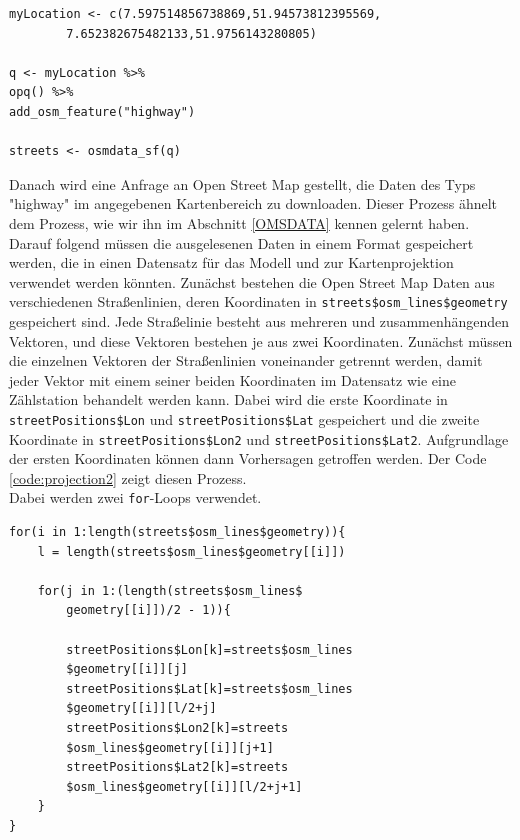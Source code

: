 \documentclass[a4paper,12pt]{thesis}
\begin{document}
\begin{lstlisting}[caption={Wahl des Kartenausschnitts},label=code:projection1]
myLocation <- c(7.597514856738869,51.94573812395569,   
		7.652382675482133,51.9756143280805)
		
q <- myLocation %>% 
opq() %>%
add_osm_feature("highway")

streets <- osmdata_sf(q)
\end{lstlisting}

Danach wird eine Anfrage an Open Street Map gestellt, die Daten des Typs "highway" im angegebenen Kartenbereich zu downloaden. Dieser Prozess ähnelt dem Prozess, wie wir ihn im Abschnitt \ref{OMSDATA} kennen gelernt haben.\\
Darauf folgend müssen die ausgelesenen Daten in einem Format gespeichert werden, die in einen Datensatz für das Modell und zur Kartenprojektion verwendet werden könnten. Zunächst bestehen die Open Street Map Daten aus verschiedenen Straßenlinien, deren Koordinaten in \lstinline|streets$osm_lines$geometry| gespeichert sind. Jede Straßelinie besteht aus mehreren und zusammenhängenden Vektoren, und diese Vektoren bestehen je aus zwei Koordinaten. Zunächst müssen die einzelnen Vektoren der Straßenlinien voneinander getrennt werden, damit jeder Vektor mit einem seiner beiden Koordinaten im Datensatz wie eine Zählstation behandelt werden kann. Dabei wird die erste Koordinate in \lstinline|streetPositions$Lon| und \lstinline|streetPositions$Lat| gespeichert und die zweite Koordinate in \lstinline|streetPositions$Lon2| und \lstinline|streetPositions$Lat2|. Aufgrundlage der ersten Koordinaten können dann Vorhersagen getroffen werden. Der Code \ref{code:projection2} zeigt diesen Prozess.\\
Dabei werden zwei \lstinline|for|-Loops verwendet.

\begin{lstlisting}[caption={Wahl des Kartenausschnitts},label=code:projection2]
for(i in 1:length(streets$osm_lines$geometry)){
	l = length(streets$osm_lines$geometry[[i]])
	
	for(j in 1:(length(streets$osm_lines$
		geometry[[i]])/2 - 1)){
	
		streetPositions$Lon[k]=streets$osm_lines
		$geometry[[i]][j]
		streetPositions$Lat[k]=streets$osm_lines
		$geometry[[i]][l/2+j]
		streetPositions$Lon2[k]=streets
		$osm_lines$geometry[[i]][j+1]
		streetPositions$Lat2[k]=streets
		$osm_lines$geometry[[i]][l/2+j+1]
	}
}
	
\end{lstlisting}
\end{document}
